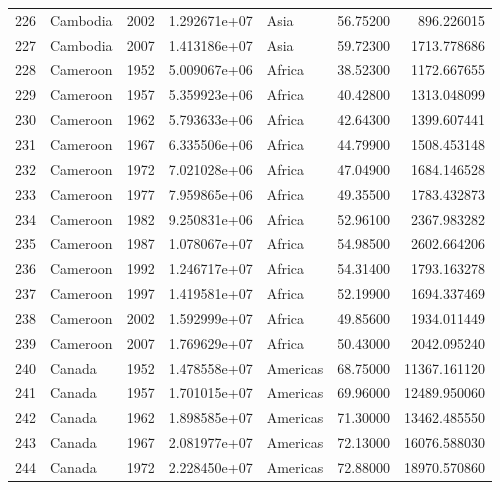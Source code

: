 \documentclass[
  letterpaper,
  DIV=11,
  numbers=noendperiod]{scrreprt}
\begin{document}
\begin{tabular}{llrrlrr}
226  &                  Cambodia &  2002 &  1.292671e+07 &      Asia &  56.75200 &     896.226015 \\
227  &                  Cambodia &  2007 &  1.413186e+07 &      Asia &  59.72300 &    1713.778686 \\
228  &                  Cameroon &  1952 &  5.009067e+06 &    Africa &  38.52300 &    1172.667655 \\
229  &                  Cameroon &  1957 &  5.359923e+06 &    Africa &  40.42800 &    1313.048099 \\
230  &                  Cameroon &  1962 &  5.793633e+06 &    Africa &  42.64300 &    1399.607441 \\
231  &                  Cameroon &  1967 &  6.335506e+06 &    Africa &  44.79900 &    1508.453148 \\
232  &                  Cameroon &  1972 &  7.021028e+06 &    Africa &  47.04900 &    1684.146528 \\
233  &                  Cameroon &  1977 &  7.959865e+06 &    Africa &  49.35500 &    1783.432873 \\
234  &                  Cameroon &  1982 &  9.250831e+06 &    Africa &  52.96100 &    2367.983282 \\
235  &                  Cameroon &  1987 &  1.078067e+07 &    Africa &  54.98500 &    2602.664206 \\
236  &                  Cameroon &  1992 &  1.246717e+07 &    Africa &  54.31400 &    1793.163278 \\
237  &                  Cameroon &  1997 &  1.419581e+07 &    Africa &  52.19900 &    1694.337469 \\
238  &                  Cameroon &  2002 &  1.592999e+07 &    Africa &  49.85600 &    1934.011449 \\
239  &                  Cameroon &  2007 &  1.769629e+07 &    Africa &  50.43000 &    2042.095240 \\
240  &                    Canada &  1952 &  1.478558e+07 &  Americas &  68.75000 &   11367.161120 \\
241  &                    Canada &  1957 &  1.701015e+07 &  Americas &  69.96000 &   12489.950060 \\
242  &                    Canada &  1962 &  1.898585e+07 &  Americas &  71.30000 &   13462.485550 \\
243  &                    Canada &  1967 &  2.081977e+07 &  Americas &  72.13000 &   16076.588030 \\
244  &                    Canada &  1972 &  2.228450e+07 &  Americas &  72.88000 &   18970.570860 \\

\end{tabular}
\end{document}
